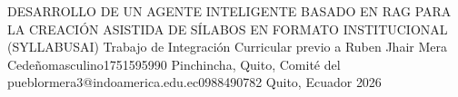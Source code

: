 \documentclass[12pt,a4paper,oneside]{report}
\begin{document}
{DESARROLLO DE UN AGENTE INTELIGENTE BASADO EN RAG PARA LA CREACIÓN ASISTIDA DE SÍLABOS EN FORMATO INSTITUCIONAL (SYLLABUSAI)} %
{Trabajo de Integración Curricular previo a \UTIFraseTituloPortada} %
{\UTIDatosAutores
  {Ruben Jhair Mera Cedeño}{masculino}{1751595990}
  {Pinchincha, Quito, Comité del pueblo}{rmera3@indoamerica.edu.ec}{0988490782}}
{} %
{Quito, Ecuador} %
{2026} %

\UTIFrontMatter


















\UTIMainMatter








\UTIAppendixMatter


\end{document}
